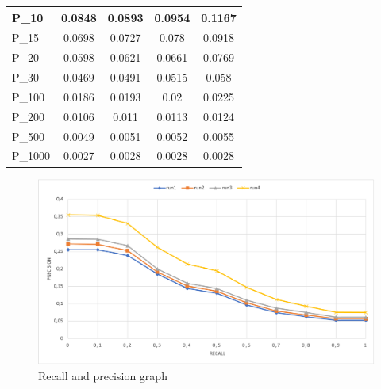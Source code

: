 \begin{center}
\begin{table}[h!]
\begin{tabular}{ |l|c|c|c|c| }
        P\_10 & 0.0848 & 0.0893 & 0.0954 & 0.1167 \\ \hline
        P\_15 & 0.0698 & 0.0727 & 0.078 & 0.0918 \\ \hline
        P\_20 & 0.0598 & 0.0621 & 0.0661 & 0.0769 \\ \hline
        P\_30 & 0.0469 & 0.0491 & 0.0515 & 0.058 \\ \hline
        P\_100 & 0.0186 & 0.0193 & 0.02 & 0.0225 \\ \hline
        P\_200 & 0.0106 & 0.011 & 0.0113 & 0.0124 \\ \hline
        P\_500 & 0.0049 & 0.0051 & 0.0052 & 0.0055 \\ \hline
        P\_1000 & 0.0027 & 0.0028 & 0.0028 & 0.0028 \\ \hline
    \end{tabular}
    \end{table}
\end{center}



\begin{figure}[h!]
    \includegraphics[width=\textwidth]{figure/rp_eng.png}
    \caption{Recall and precision graph}
    \label{fig:rp_english}
  \end{figure}